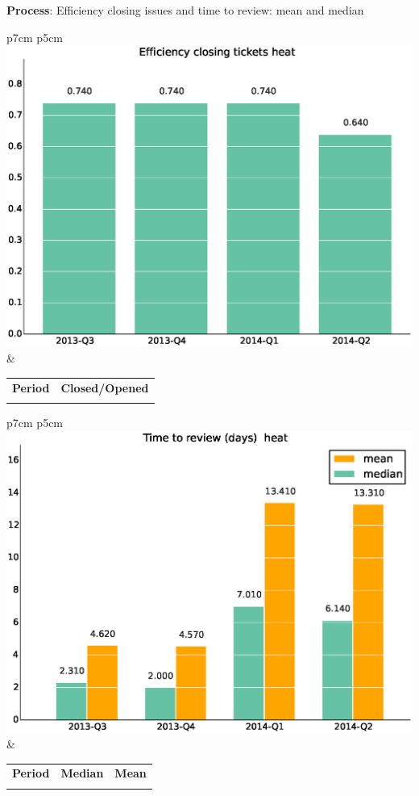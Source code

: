 \documentclass[a4wide,11pt]{report}
\begin{document}
\textbf{Process}: Efficiency closing issues and time to review: mean and median

\begin{tabular}{p{7cm} p{5cm}}
    \vspace{0pt} 
    \includegraphics[scale=.35]{figs/bmiheat.eps}
    & 
    \vspace{0pt}
    \begin{tabular}{l|l}%
    \bfseries Period & \bfseries Closed/Opened %
    \csvreader[head to column names]{data/bmiheat.csv}{}%
    {\\ & \bmi}
    \end{tabular}
\end{tabular}

\begin{tabular}{p{7cm} p{5cm}}
    \vspace{0pt} 
    \includegraphics[scale=.35]{figs/timetoreview_medianheat.eps}
    & 
    \vspace{0pt}
    \begin{tabular}{l|r|r|}%
    \bfseries Period & \bfseries Median & \bfseries Mean %
    \csvreader[head to column names]{data/timetoreview_medianheat.csv}{}%
    {\\ & \mediantime & \meantime}
    \end{tabular}
\end{tabular}
\end{document}
